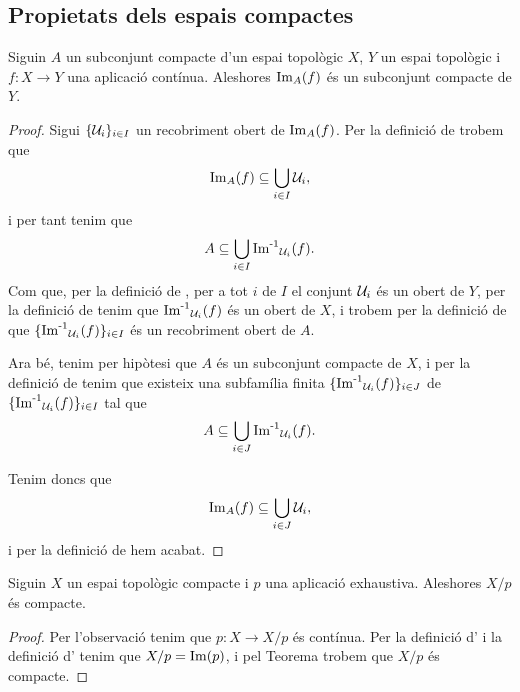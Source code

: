 \documentclass[../Apunts.tex]{subfiles}
\begin{document}
	\subsection{Propietats dels espais compactes}
	\begin{theorem}
		\label{thm:la imatge d'un compacte per una aplicació contínua és un compacte}
		Siguin \(A\) un subconjunt compacte d'un espai topològic \(X\), \(Y\) un espai topològic i \(f\colon X\longrightarrow Y\) una aplicació contínua. Aleshores \(\operatorname{Im}_{A}(f)\) és un subconjunt compacte de \(Y\).
		\begin{proof} %
			Sigui \(\{\mathcal{U}_{i}\}_{i\in I}\) un recobriment obert de \(\operatorname{Im}_{A}(f)\). Per la definició de  trobem que
			\[\operatorname{Im}_{A}(f)\subseteq\bigcup_{i\in I}\mathcal{U}_{i},\]
			i per tant tenim que
			\[A\subseteq\bigcup_{i\in I}\operatorname{\operatorname{Im}^{-1}}_{\mathcal{U}_{i}}(f).\]
			Com que, per la definició de , per a tot \(i\) de \(I\) el conjunt \(\mathcal{U}_{i}\) és un obert de \(Y\), per la definició de  tenim que \(\operatorname{\operatorname{Im}^{-1}}_{\mathcal{U}_{i}}(f)\) és un obert de \(X\), i trobem per la definició de  que \(\{\operatorname{\operatorname{Im}^{-1}}_{\mathcal{U}_{i}}(f)\}_{i\in I}\) és un recobriment obert de \(A\).
			
			Ara bé, tenim per hipòtesi que \(A\) és un subconjunt compacte de \(X\), i per la definició de  tenim que existeix una subfamília finita \(\{\operatorname{\operatorname{Im}^{-1}}_{\mathcal{U}_{i}}(f)\}_{i\in J}\) de \(\{\operatorname{\operatorname{Im}^{-1}}_{\mathcal{U}_{i}}(f)\}_{i\in I}\) tal que
			\[A\subseteq\bigcup_{i\in J}\operatorname{\operatorname{Im}^{-1}}_{\mathcal{U}_{i}}(f).\]
			
			Tenim doncs que
			\[\operatorname{Im}_{A}(f)\subseteq\bigcup_{i\in J}\mathcal{U}_{i},\]
			i per la definició de  hem acabat.
		\end{proof}
	\end{theorem}
	\begin{corollary}
		\label{cor:el quocient d'un compacte és un compacte}
		Siguin \(X\) un espai topològic compacte i \(p\) una aplicació exhaustiva. Aleshores \(X/p\) és compacte.
		\begin{proof}
			Per l'observació  tenim que \(p\colon X\longrightarrow X/p\) és contínua. Per la definició d' i la definició d' tenim que \(X/p=\operatorname{Im}(p)\), i pel Teorema  trobem que \(X/p\) és compacte.
		\end{proof}
	\end{corollary}
\end{document}
